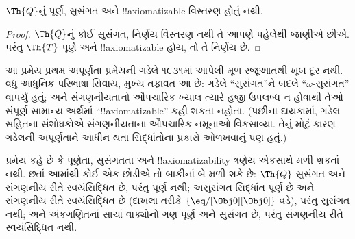 \documentclass[../../../include/open-logic-section]{subfiles}
\begin{document}


\begin{thm}
$\Th{Q}$નું પૂર્ણ, સુસંગત અને
!!{axiomatizable} વિસ્તરણ
હોતું નથી.
\end{thm}

\begin{proof}
$\Th{Q}$નું કોઈ સુસંગત,
નિર્ણેય વિસ્તરણ નથી
તે આપણે પહેલેથી જાણીએ છીએ.
પરંતુ $\Th{T}$ પૂર્ણ અને
!!{axiomatizable} હોય,
તો તે નિર્ણેય છે.
\end{proof}

\begin{explain}
આ પ્રમેય પ્રથમ અપૂર્ણતા
પ્રમેયની ગડેલે ૧૯૩૧માં
આપેલી મૂળ રજૂઆતથી
ખૂબ દૂર નથી.
વધુ આધુનિક પરિભાષા સિવાય,
મુખ્ય તફાવત આ છે:
ગડેલે ``સુસંગત''ને બદલે
``$\omega$-સુસંગત''
વાપર્યું હતું; અને સંગણનીયતાનો
ઔપચારિક ખ્યાલ ત્યારે હજી
ઉપલબ્ધ ન હોવાથી તેઓ
સંપૂર્ણ સામાન્ય અર્થમાં
``!!{axiomatizable}'' કહી
શકતા નહોતા. (પછીના
દાયકામાં, ગડેલ સહિતના
સંશોધકોએ સંગણનીયતાના
ઔપચારિક નમૂનાઓ વિકસાવ્યા.
તેનું મોટું કારણ ગડેલની
અપૂર્ણતાને આધીન થતા
સિદ્ધાંતોના પ્રકારો ઓળખવાનું
પણ હતું.)

પ્રમેય કહે છે કે પૂર્ણતા,
સુસંગતતા અને
!!{axiomatizability}
ત્રણેય એકસાથે મળી શકતાં
નથી. છતાં આમાંથી કોઈ
એક છોડીએ તો બાકીનાં બે
મળી શકે છે: $\Th{Q}$
સુસંગત અને સંગણનીય રીતે
સ્વયંસિદ્ધિત છે, પરંતુ
પૂર્ણ નથી; અસુસંગત
સિદ્ધાંત પૂર્ણ છે અને
સંગણનીય રીતે સ્વયંસિદ્ધિત
છે (દાખલા તરીકે
$\{ \eq/[\Obj 0][\Obj 0] \}$ વડે),
પરંતુ સુસંગત નથી; અને
અંકગણિતનાં સાચાં વાક્યોનો
ગણ પૂર્ણ અને સુસંગત છે,
પરંતુ સંગણનીય રીતે
સ્વયંસિદ્ધિત નથી.
\end{explain}
\end{document}
